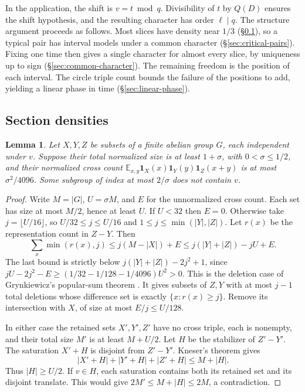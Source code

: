 \documentclass[11pt,reqno]{amsart}
\newtheorem{lemma}[theorem]{Lemma}
\newcommand{\E}{\mathbb E}
\newcommand{\ind}{\mathbf 1}
\numberwithin{equation}{section}
\begin{document}
In the application, the shift is \(v=t\bmod q\).
Divisibility of \(t\) by \(Q(D)\) ensures the shift hypothesis,
and the resulting character has order \(\ell\mid q\).
The structure argument proceeds as follows.
Most slices have density near \(1/3\) (\S\ref{sec:slice-densities}),
so a typical pair has interval models under a common character
(\S\ref{sec:critical-pairs}). Fixing one time then gives a single
character for almost every slice, by uniqueness up to sign
(\S\ref{sec:common-character}). The remaining freedom is the
position of each interval. The circle triple count bounds the
failure of the positions to add, yielding a linear phase in time
(\S\ref{sec:linear-phase}).

\subsection{Section densities}\label{sec:slice-densities}

\begin{lemma}\label{lem:finite-exclusion}
Let \(X,Y,Z\) be subsets of a finite abelian group \(G\), each
independent under \(v\). Suppose their total normalized size is
at least \(1+\sigma\), with \(0<\sigma\le1/2\), and their normalized
cross count \(\E_{x,y}\ind_X(x)\ind_Y(y)\ind_Z(x+y)\) is at most
\(\sigma^2/4096\). Some subgroup of index at most \(2/\sigma\)
does not contain \(v\).
\end{lemma}

\begin{proof}
Write \(M=|G|\), \(U=\sigma M\), and \(E\) for the unnormalized
cross count. Each set has size at most \(M/2\), hence at least \(U\).
If \(U<32\) then \(E=0\). Otherwise take \(j=\lfloor U/16\rfloor\),
so \(U/32\le j\le U/16\) and \(1\le j\le\min(|Y|,|Z|)\).
Let \(r(x)\) be the representation count in \(Z-Y\). Then
\[
 \sum_x\min(r(x),j)\le j(M-|X|)+E
 \le j(|Y|+|Z|)-jU+E .
\]
The last bound is strictly below \(j(|Y|+|Z|)-2j^2+1\),
since \(jU-2j^2-E\ge (1/32-1/128-1/4096)U^2>0\).
This is the deletion case of Grynkiewicz's popular-sum theorem
\cite[Theorem~1.1]{grynkiewicz}. It gives subsets of \(Z,Y\)
with at most \(j-1\) total deletions whose difference set is
exactly \(\{x:r(x)\ge j\}\).
Remove its intersection with \(X\), of size at most \(E/j\le U/128\).

In either case the retained sets \(X',Y',Z'\) have no cross
triple, each is nonempty, and their total size \(M'\) is at least
\(M+U/2\). Let \(H\) be the stabilizer of \(Z'-Y'\).
The saturation \(X'+H\) is disjoint from \(Z'-Y'\).
Kneser's theorem \cite[Theorem~1]{devos} gives
\[
 |X'+H|+|Y'+H|+|Z'+H|\le M+|H|.
\]
Thus \(|H|\ge U/2\). If \(v\in H\), each saturation contains
both its retained set and its disjoint translate. This would give
\(2M'\le M+|H|\le2M\), a contradiction.
\end{proof}
\end{document}
